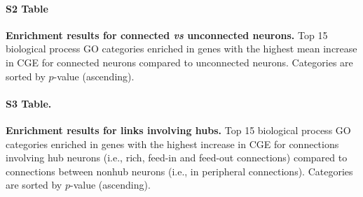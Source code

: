 \documentclass[10pt,letterpaper]{article}
\begin{document}
\paragraph*{S2 Table}
\label{tab:enrichmentCON}
{\bf Enrichment results for connected \textit{vs} unconnected neurons.} Top 15 biological process GO categories enriched in genes with the highest mean increase in CGE for connected neurons compared to unconnected neurons.
Categories are sorted by $p$-value (ascending).
\paragraph*{S3 Table.}
\label{tab:enrichmentRICH}
{\bf Enrichment results for links involving hubs.} Top 15 biological process GO categories enriched in genes with the highest increase in CGE for connections involving hub neurons (i.e., rich, feed-in and feed-out connections) compared to connections between nonhub neurons (i.e., in peripheral connections).
Categories are sorted by $p$-value (ascending).

\clearpage


\end{document}
